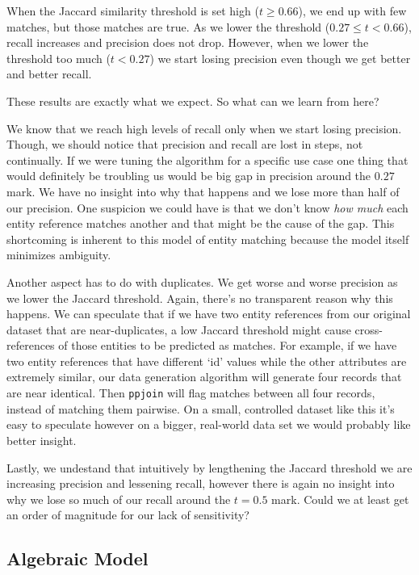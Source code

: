 \documentclass[11pt]{article}
\begin{document}
    When the Jaccard similarity threshold is set high ($t \geq 0.66$), we end up
    with few matches, but those matches are true.
    As we lower the threshold ($0.27 \leq t < 0.66$), recall increases and
    precision does not drop.
    However, when we lower the threshold too much ($t < 0.27$) we start losing
    precision even though we get better and better recall.
    
    These results are exactly what we expect.
    So what can we learn from here?

    We know that we reach high levels of recall only when we start losing
    precision.
    Though, we should notice that precision and recall are lost in steps, not
    continually.
    If we were tuning the algorithm for a specific use case one thing that would
    definitely be troubling us would be big gap in precision around the $0.27$
    mark.
    We have no insight into why that happens and we lose more than half of our
    precision.
    One suspicion we could have is that we don't know \textit{how much} each
    entity reference matches another and that might be the cause of the gap.
    This shortcoming is inherent to this model of entity matching because the
    model itself minimizes ambiguity.
    
    Another aspect has to do with duplicates.
    We get worse and worse precision as we lower the Jaccard threshold.
    Again, there's no transparent reason why this happens.
    We can speculate that if we have two entity references from our original
    dataset that are near-duplicates, a low Jaccard threshold might cause
    cross-references of those entities to be predicted as matches.
    For example, if we have two entity references that have different `id'
    values while the other attributes are extremely similar, our data generation
    algorithm will generate four records that are near identical.
    Then \texttt{ppjoin} will flag matches between all four records, instead of
    matching them pairwise.
    On a small, controlled dataset like this it's easy to speculate however on a
    bigger, real-world data set we would probably like better insight.

    Lastly, we undestand that intuitively by lengthening the Jaccard threshold
    we are increasing precision and lessening recall, however there is again no
    insight into why we lose so much of our recall around the $t=0.5$ mark.
    Could we at least get an order of magnitude for our lack of sensitivity?

    \subsection{Algebraic Model}
\end{document}
